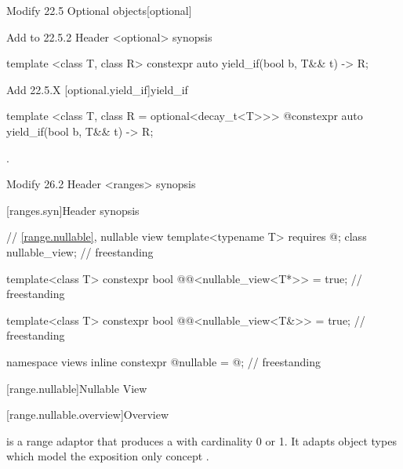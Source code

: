 Modify 22.5 Optional objects[optional]

Add to 22.5.2 Header <optional> synopsis
\begin{codeblock}
template <class T, class R>
constexpr auto yield_if(bool b, T&& t) -> R;
\end{codeblock}

Add 22.5.X
[optional.yield_if]{yield_if}

%
\begin{itemdecl}
template <class T, class R = optional<decay_t<T>>>
@constexpr auto yield_if(bool b, T\&\& t) -> R;
\end{itemdecl}

\begin{itemdescr}
\pnum
\returns
{}.
\end{itemdescr}



Modify 26.2 Header <ranges> synopsis

[ranges.syn]{Header  synopsis}

\begin{adjustwidth}{1cm}{1cm}
  \begin{addedblock}
    \begin{codeblock}
// \ref{range.nullable}, nullable view
template<typename T>
requires @\seebelow@;
class nullable_view;                                       // freestanding

template<class T>
constexpr bool
@@<nullable_view<T*>> = true;  // freestanding

template<class T>
constexpr bool
@@<nullable_view<T&>> = true;  // freestanding

namespace views {
  inline constexpr @\unspec@ nullable = @\unspec@;          // freestanding
}



    \end{codeblock}
  \end{addedblock}
\end{adjustwidth}


[range.nullable]{Nullable View}

[range.nullable.overview]{Overview}

\pnum
{} is a range adaptor that produces a  with cardinality 0 or 1. It adapts object types which model the exposition only concept .


